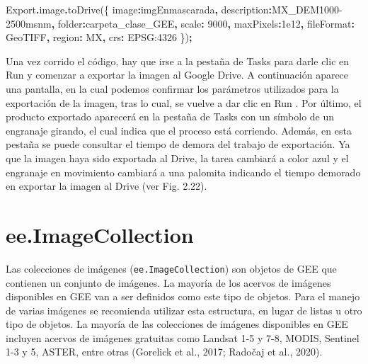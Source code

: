 \documentclass[
  12pt,
  letterpaper,
  twoside]{book}
\newenvironment{Shaded}{\begin{snugshade}}{\end{snugshade}}
\newcommand{\AttributeTok}[1]{\textcolor[rgb]{0.77,0.63,0.00}{#1}}
\newcommand{\DataTypeTok}[1]{\textcolor[rgb]{0.13,0.29,0.53}{#1}}
\newcommand{\DecValTok}[1]{\textcolor[rgb]{0.00,0.00,0.81}{#1}}
\newcommand{\FloatTok}[1]{\textcolor[rgb]{0.00,0.00,0.81}{#1}}
\newcommand{\FunctionTok}[1]{\textcolor[rgb]{0.00,0.00,0.00}{#1}}
\newcommand{\NormalTok}[1]{#1}
\newcommand{\OperatorTok}[1]{\textcolor[rgb]{0.81,0.36,0.00}{\textbf{#1}}}
\newcommand{\StringTok}[1]{\textcolor[rgb]{0.31,0.60,0.02}{#1}}
\begin{document}
\begin{Shaded}
\begin{Highlighting}[]
\NormalTok{Export}\OperatorTok{.}\AttributeTok{image}\OperatorTok{.}\FunctionTok{toDrive}\NormalTok{(\{}
  \DataTypeTok{image}\OperatorTok{:}\NormalTok{imgEnmascarada}\OperatorTok{,} 
  \DataTypeTok{description}\OperatorTok{:}\StringTok{\textquotesingle{}MX\_DEM1000{-}2500msnm\textquotesingle{}}\OperatorTok{,}
  \DataTypeTok{folder}\OperatorTok{:}\StringTok{\textquotesingle{}carpeta\_clase\_GEE\textquotesingle{}}\OperatorTok{,}
  \DataTypeTok{scale}\OperatorTok{:} \DecValTok{9000}\OperatorTok{,}
  \DataTypeTok{maxPixels}\OperatorTok{:}\FloatTok{1e12}\OperatorTok{,}
  \DataTypeTok{fileFormat}\OperatorTok{:} \StringTok{\textquotesingle{}GeoTIFF\textquotesingle{}}\OperatorTok{,}
  \DataTypeTok{region}\OperatorTok{:}\NormalTok{ MX}\OperatorTok{,}
  \DataTypeTok{crs}\OperatorTok{:} \StringTok{\textquotesingle{}EPSG:4326\textquotesingle{}}
\NormalTok{\})}\OperatorTok{;}
\end{Highlighting}
\end{Shaded}

Una vez corrido el código, hay que irse a la pestaña de Tasks para darle clic en Run y comenzar a exportar la imagen al Google Drive. A continuación aparece una pantalla, en la cual podemos confirmar los parámetros utilizados para la exportación de la imagen, tras lo cual, se vuelve a dar clic en Run . Por último, el producto exportado aparecerá en la pestaña de Tasks con un símbolo de un engranaje girando, el cual indica que el proceso está corriendo. Además, en esta pestaña se puede consultar el tiempo de demora del trabajo de exportación. Ya que la imagen haya sido exportada al Drive, la tarea cambiará a color azul y el engranaje en movimiento cambiará a una palomita indicando el tiempo demorado en exportar la imagen al Drive (ver Fig. 2.22).

\newpage

\hypertarget{ee.imagecollection}{%
\chapter{ee.ImageCollection}\label{ee.imagecollection}}

Las colecciones de imágenes (\texttt{ee.ImageCollection}) son objetos de GEE que contienen un conjunto de imágenes. La mayoría de los acervos de imágenes disponibles en GEE van a ser definidos como este tipo de objetos. Para el manejo de varias imágenes se recomienda utilizar esta estructura, en lugar de listas u otro tipo de objetos. La mayoría de las colecciones de imágenes disponibles en GEE incluyen acervos de imágenes gratuitas como Landsat 1-5 y 7-8, MODIS, Sentinel 1-3 y 5, ASTER, entre otras (Gorelick et al., 2017; Radočaj et al., 2020).
\end{document}
